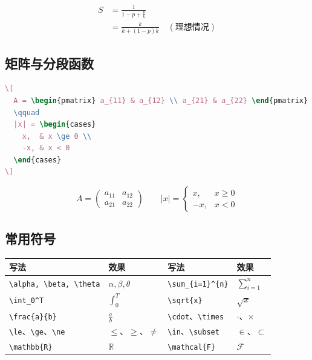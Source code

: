 \begin{align}
  S &= \frac{1}{1-p+\frac{p}{k}} \\
    &= \frac{k}{k+(1-p)k} \quad (\text{理想情况})
\end{align}

\subsection{矩阵与分段函数}

\begin{lstlisting}[language=TeX]
\[
  A = \begin{pmatrix} a_{11} & a_{12} \\ a_{21} & a_{22} \end{pmatrix}
  \qquad
  |x| = \begin{cases}
    x,  & x \ge 0 \\
    -x, & x < 0
  \end{cases}
\]
\end{lstlisting}

\[
  A = \begin{pmatrix} a_{11} & a_{12} \\ a_{21} & a_{22} \end{pmatrix}
  \qquad
  |x| = \begin{cases}
    x,  & x \ge 0 \\
    -x, & x < 0
  \end{cases}
\]

\subsection{常用符号}

\begin{center}
\begin{tabular}{@{}llll@{}}
\toprule
写法 & 效果 & 写法 & 效果 \\
\midrule
\verb|\alpha, \beta, \theta| & $\alpha,\beta,\theta$ &
\verb|\sum_{i=1}^{n}| & $\sum_{i=1}^{n}$ \\
\verb|\int_0^T| & $\int_0^T$ &
\verb|\sqrt{x}| & $\sqrt{x}$ \\
\verb|\frac{a}{b}| & $\frac{a}{b}$ &
\verb|\cdot|、\verb|\times| & $\cdot$、$\times$ \\
\verb|\le|、\verb|\ge|、\verb|\ne| & $\le$、$\ge$、$\ne$ &
\verb|\in|、\verb|\subset| & $\in$、$\subset$ \\
\verb|\mathbb{R}| & $\mathbb{R}$ &
\verb|\mathcal{F}| & $\mathcal{F}$ \\
\bottomrule
\end{tabular}
\end{center}

